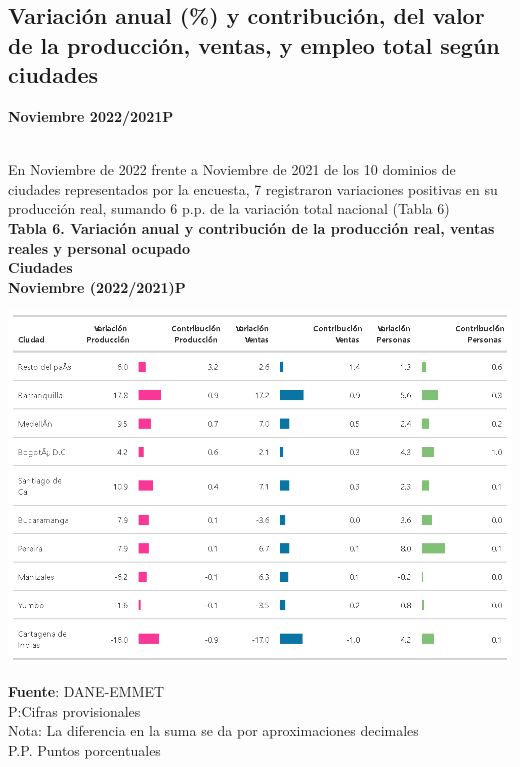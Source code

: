\documentclass[
]{article}
\begin{document}
\hypertarget{variaciuxf3n-anual-y-contribuciuxf3n-del-valor-de-la-producciuxf3n-ventas-y-empleo-total-seguxfan-ciudades}{%
\subsection{Variación anual (\%) y contribución, del valor de la
producción, ventas, y empleo total según
ciudades}\label{variaciuxf3n-anual-y-contribuciuxf3n-del-valor-de-la-producciuxf3n-ventas-y-empleo-total-seguxfan-ciudades}}

\textbf{Noviembre 2022/2021P}\\
\strut \\
En Noviembre de 2022 frente a Noviembre de 2021 de los 10 dominios de
ciudades representados por la encuesta, 7 registraron variaciones
positivas en su producción real, sumando 6 p.p. de la variación total
nacional (Tabla 6)\\
\newpage \textbf{Tabla 6. Variación anual y contribución de la
producción real, ventas reales y personal ocupado}\\
\textbf{Ciudades}\\
\textbf{Noviembre  (2022/2021)P}

\begin{center}\includegraphics[width=12.58in]{tabla6_1} \end{center}

\textbf{Fuente}: DANE-EMMET\\
P:Cifras provisionales\\
Nota: La diferencia en la suma se da por aproximaciones decimales\\
P.P. Puntos porcentuales\\
\end{document}
